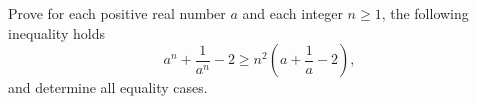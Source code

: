 Prove for each positive real number $a$ and each integer $n\geq 1$, the following inequality holds
$$a^{n} + \frac{1}{a^{n}} - 2 \geq n^{2}\left(a + \frac{1}{a} - 2\right),$$
and determine all equality cases.
